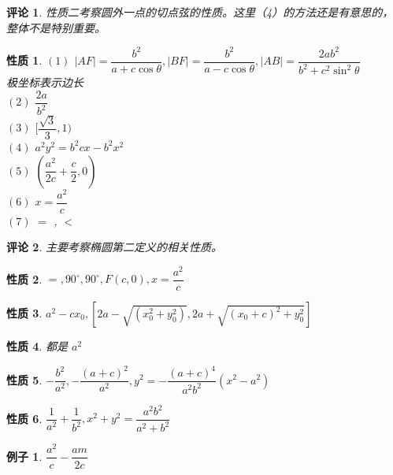\documentclass[a4paper,10pt,twoside]{article}
\newtheorem{example}{例子}[section]
\newtheorem{remark}{评论}
\newtheorem{proposition}{性质}
\begin{document}
\begin{remark}
    性质二考察圆外一点的切点弦的性质。这里（4）的方法还是有意思的，整体不是特别重要。
\end{remark}
\begin{proposition}
     $ (1) $  $ |AF|=\dfrac{b^2}{a+c\cos \theta },|BF|=\dfrac{b^2 }{a-c\cos \theta },|AB|=\dfrac{2ab^2 }{b^2+c^2\sin^2\theta} $\\极坐标表示边长\\
      $ (2 ) $  $ \dfrac{2a }{b^2} $\\
       $ (3) $  $ [\dfrac{\sqrt{3}}{3},1)  $\\
     $ (4) $  $ a^2y^2=b^2cx-b^2x^2 $ \\
      $ (5)  $  $ (\dfrac{a^2 }{2c }+\dfrac{c }{2 },0) $\\
       $ (6 ) $  $ x=\dfrac{a^2 }{c } $\\
        $ (7) $ $ = $ , $ < $    
\end{proposition}
\begin{remark}
    主要考察椭圆第二定义的相关性质。
\end{remark}
\begin{proposition}
     $ =,90^{\circ},90^{\circ},F(c,0),x=\dfrac{a^2}{c }$ 
\end{proposition}
\begin{proposition}
     $ a^2-cx_0,[2a-\sqrt{(x_0^2+y_0^2)},2a+\sqrt{(x_0+c)^2+y_0^2}] $ 
\end{proposition}

\begin{proposition}
    都是 $ a^2 $ 
\end{proposition}
\begin{proposition}
     $ -\dfrac{b^2 }{a^2 },-\dfrac{(a+c)^2 }{a^2},y^2=-\dfrac{(a+c)^4 }{a^2b^2 }(x^2-a^2) $ 
\end{proposition}
\begin{proposition}
     $ \dfrac{1 }{a^2}+\dfrac{1 }{b^2 },x^2+y^2=\dfrac{a^2b^2 }{a^2+b^2} $ 
\end{proposition}
\begin{example}
     $ \dfrac{a^2 }{c}-\dfrac{am }{2c } $ 
\end{example}
\end{document}
